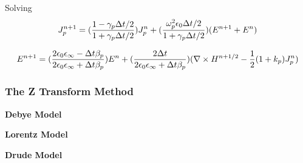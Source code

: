 Solving
\begin{displaymath}
  J_p^{n+1} = \Huge(\frac{1-\gamma_p\Delta t /2}{1+\gamma_p\Delta t /2}\Huge)J_p^n + \Huge(\frac{\omega_p^2\epsilon_0\Delta t /2}{1+\gamma_p\Delta t /2}\Huge)(E^{n+1}+E^n)
\end{displaymath}


\begin{displaymath}
  E^{n+1} = \Huge(\frac{2\epsilon_0\epsilon_{\infty} - \Delta t \beta_p}{2\epsilon_0\epsilon_{\infty} + \Delta t \beta_p}\Huge)E^n + \Huge(\frac{2\Delta t}{2\epsilon_0\epsilon_{\infty} + \Delta t \beta_p}\Huge)\Huge(\nabla\times H^{n+1/2} - \frac{1}{2}(1+k_p)J_p^n\Huge)
\end{displaymath}



\subsubsection{The Z Transform Method}
\textbf{Debye Model}

\textbf{Lorentz Model}

\textbf{Drude Model}
